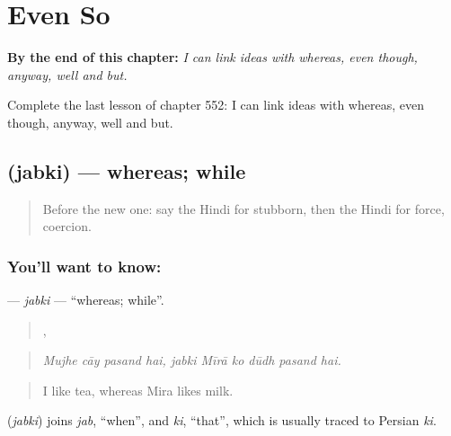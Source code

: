 
\chapter{Even So}
\label{ch:hi-even-so}

\begin{chapteropening}
\textbf{By the end of this chapter:} \emph{I can link ideas with whereas, even though, anyway, well and but.}

Complete the last lesson of chapter 552: I can link ideas with whereas, even though, anyway, well and but.
\end{chapteropening}

\section[\texorpdfstring{\hi{जबकि} (jabki)}{जबकि (jabki)}]{ (jabki) — whereas; while}

\label{lesson:HI-C552-jabki}



\begin{quote}
Before the new one: say the Hindi for stubborn, then the Hindi for force, coercion.
\end{quote}

\subsection*{You'll want to know: }
\textbf{} — \emph{jabki} — \textquotedblleft{}whereas; while\textquotedblright{}.

\begin{quote}
   ,      
\end{quote}

\begin{quote}
\emph{Mujhe cāy pasand hai, jabki Mīrā ko dūdh pasand hai.}
\end{quote}

\begin{quote}
I like tea, whereas Mira likes milk.
\end{quote}

\begin{cousinweb}
\textbf{} (\emph{jabki}) joins \emph{jab}, \textquotedblleft{}when\textquotedblright{}, and \emph{ki}, \textquotedblleft{}that\textquotedblright{}, which is usually traced to Persian \emph{ki}.
\end{cousinweb}

